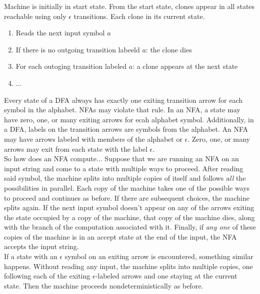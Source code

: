 \documentclass{article}
\begin{document}
Machine is initially in start state. From the start state, clones appear in all states reachable using only $\epsilon$ transitions. Each clone in its current state. 
\begin{enumerate}
  \item Reads the next input symbol $a$ 
  \item If there is no outgoing transition labeeld $a$: the clone dies 
  \item For each outoging transition labeled $a$: a clone appears at the next state 
  \item ...
\end{enumerate}

Every state of a DFA always has exactly one exiting transition arrow for each symbol in the alphabet. NFAs may violate that rule. In an NFA, a state may have zero, one, or many exiting arrows for ecah alphabet symbol. Additionally, in a DFA, labels on the transition arrows are symbols from the alphabet. An NFA may have arrows labeled with members of the alphabet or $\epsilon$. Zero, one, or many arrows may exit from each state with the label $\epsilon$. \\ 

So how does an NFA compute$\dots$ Suppose that we are running an NFA on an input string and come to a state with multiple ways to proceed. After reading said symbol, the machine splits into multiple copies of itself and follows \emph{all} the possibilities in parallel. Each copy of the machine takes one of the possible ways to proceed and continues as before. If there are subsequent choices, the machine splits again. If the next input symbol doesn't appear on any of the arrows exiting the state occupied by a copy of the machine, that copy of the machine dies, along with the branch of the computation associated with it. Finally, if \emph{any one} of these copies of the machine is in an accept state at the end of the input, the NFA accepts the input string. \\ 

If a state with an $\epsilon$ symbol on an exiting arrow is encountered, something similar happens. Without reading any input, the machine splits into multiple copies, one following each of the exiting $\epsilon$-labeled arrows and one staying at the current state. Then the machine proceeds nondeterministically as before. \\ 
\end{document}
